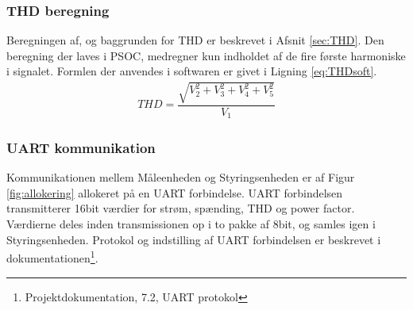 
\subsubsection{THD beregning}
Beregningen af, og baggrunden for THD er beskrevet i Afsnit \ref{sec:THD}. Den beregning der laves i PSOC, medregner kun indholdet af de fire første harmoniske i signalet. Formlen der anvendes i softwaren er givet i Ligning \ref{eq:THDsoft}.
\begin{align}
\label{eq:THDsoft}
THD = \dfrac{\sqrt{V_2^{2}+V_3^{2}+V_4^{2}+V_5^{2}}}{V_{1}}
\end{align}
 

\subsubsection{UART kommunikation}
Kommunikationen mellem Måleenheden og Styringsenheden er af Figur \ref{fig:allokering} allokeret på en UART forbindelse. UART forbindelsen transmitterer 16bit værdier for strøm, spænding, THD og power factor. Værdierne deles inden transmissionen op i to pakke af 8bit, og samles igen i Styringsenheden. Protokol og indstilling af UART forbindelsen er beskrevet i dokumentationen\footnote{Projektdokumentation, 7.2, UART protokol}.




